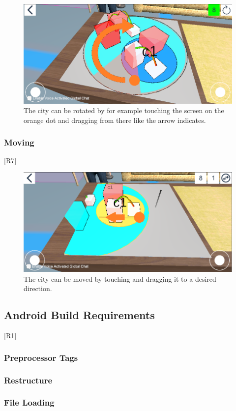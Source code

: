 \begin{figure}[htb]
    \centering
    \includegraphics[width=1\textwidth]{Implementation/img/rotate.png}
    \caption{The \gls{city} can be rotated by for example touching the screen on the orange dot and dragging from there like the arrow indicates.}\label{fig:rotate}
\end{figure}
\subsubsection{Moving}
[R7]

\begin{figure}[htb]
    \centering
    \includegraphics[width=1\textwidth]{Implementation/img/move.png}
    \caption{The \gls{city} can be moved by touching and dragging it to a desired direction.}\label{fig:left}
\end{figure}
\subsection{Android Build Requirements}
[R1]
\subsubsection{Preprocessor Tags}
\subsubsection{Restructure}
\subsubsection{File Loading}